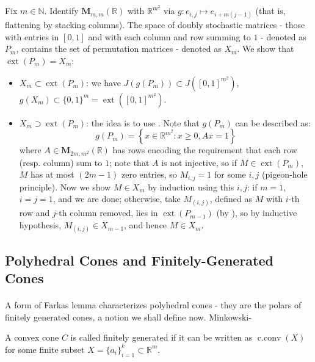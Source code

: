 \begin{exmp}
	Fix $m\in \mathbb{N}$. Identify $\mathbf{M}_{m,m}(\mathbb{R})$ with $\mathbb{R}^{m^2}$ via $g:e_{i,j}\mapsto e_{i+m(j-1)}$ (that is, flattening by stacking columns). The space of doubly stochastic matrices - those with entries in $[0,1]$ and with each column and row summing to $1$ - denoted as $P_{m}$, contains the set of permutation matrices - denoted as $X_m$. We show that $\operatorname{ext}(P_m)=X_m$:
	\begin{itemize}
		\item $X_m\subset \operatorname{ext}(P_m)$: we have $J(g(P_m))\subset J\left([0,1]^{m^2}\right)$, $g(X_m)\subset \{0,1\}^m=\operatorname{ext}\left([0,1]^{m^2}\right)$.
		\item $X_m\supset \operatorname{ext}(P_m)$: the idea is to use . Note that $g(P_m)$ can be described as:
		      \[
			      g(P_m)=\left\{
			      x\in \mathbb{R}^{m^2}:x\geq 0,Ax=1
			      \right\}
		      \]
		      where $A\in \mathbf{M}_{2m,m^2}(\mathbb{R})$ has rows encoding the requirement that each row (resp. column) sum to $1$; note that $A$ is not injective, so if $M\in \operatorname{ext}(P_m)$, $M$ has at most $(2m-1)$ zero entries, so $M_{i,j}=1$ for some $i,j$ (pigeon-hole principle). Now we show $M\in X_m$ by induction using this $i,j$: if $m=1$, $i=j=1$, and we are done; otherwise, take $M_{(i,j)}$, defined as $M$ with $i$-th row and $j$-th column removed, lies in $\operatorname{ext}(P_{m-1})$ (by ), so by inductive hypothesis, $M_{(i,j)}\in X_{m-1}$, and hence $M\in X_m$.
	\end{itemize}
\end{exmp}

\subsection{Polyhedral Cones and Finitely-Generated Cones}

\paragraph{}A form of Farkas lemma characterizes polyhedral cones - they are the polars of finitely generated cones, a notion we shall define now. Minkowski-

\begin{defn}\label{defn:017-fg-cones}
	A convex cone $C$ is called finitely generated if it can be written as $\operatorname{c.conv}(X)$ for some finite subset $X=\{a_i\}_{i=1}^k\subset \mathbb{R}^m$.
\end{defn}

